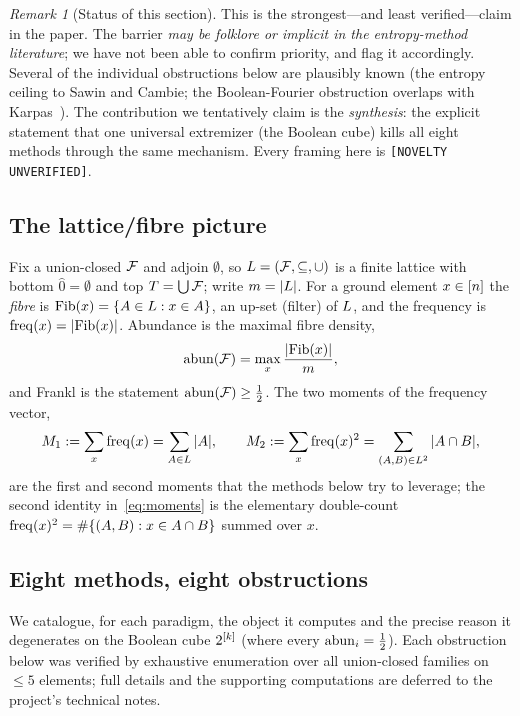 \documentclass[11pt]{amsart}
\theoremstyle{definition}
\theoremstyle{remark}
\newtheorem{remark}[theorem]{Remark}
\begin{document}
\begin{remark}[Status of this section]\label{rmk:barrier-status}
This is the strongest---and least verified---claim in the paper. The barrier
\emph{may be folklore or implicit in the entropy-method literature}; we have not
been able to confirm priority, and flag it accordingly. Several of the individual
obstructions below are plausibly known (the entropy ceiling to Sawin and Cambie;
the Boolean-Fourier obstruction overlaps with Karpas~\cite{karpas2017}). The
contribution we tentatively claim is the \emph{synthesis}: the explicit statement
that one universal extremizer (the Boolean cube) kills all eight methods through
the same mechanism. Every framing here is
\texttt{[NOVELTY UNVERIFIED]}.
\end{remark}

\subsection{The lattice/fibre picture}\label{ssec:fibre}
Fix a union-closed $\mathcal{F}$ and adjoin $\emptyset$, so $L=(\mathcal{F},\subseteq,\cup)$ is
a finite lattice with bottom $\hat 0=\emptyset$ and top $T=\bigcup\mathcal{F}$; write
$m=|L|$. For a ground element $x\in[n]$ the \emph{fibre} is
$\mathrm{Fib}(x)=\{A\in L:x\in A\}$, an up-set (filter) of $L$, and the frequency is
$\mathrm{freq}(x)=|\mathrm{Fib}(x)|$. Abundance is the maximal fibre density,
\begin{equation}\label{eq:abun-fibre}
   \operatorname{abun}(\mathcal{F})=\max_{x}\frac{|\mathrm{Fib}(x)|}{m},
\end{equation}
and Frankl is the statement $\operatorname{abun}(\mathcal{F})\ge\tfrac12$. The two moments of the
frequency vector,
\begin{equation}\label{eq:moments}
   M_1:=\sum_x\mathrm{freq}(x)=\sum_{A\in L}|A|,\qquad
   M_2:=\sum_x\mathrm{freq}(x)^2=\sum_{(A,B)\in L^2}|A\cap B|,
\end{equation}
are the first and second moments that the methods below try to leverage; the
second identity in~\eqref{eq:moments} is the elementary double-count
$\mathrm{freq}(x)^2=\#\{(A,B):x\in A\cap B\}$ summed over $x$.

\subsection{Eight methods, eight obstructions}\label{ssec:eight}
We catalogue, for each paradigm, the object it computes and the precise reason it
degenerates on the Boolean cube $2^{[k]}$ (where every $\operatorname{abun}_i=\tfrac12$). Each
obstruction below was verified by exhaustive enumeration over all union-closed
families on $\le 5$ elements; full details and the supporting computations are
deferred to the project's technical notes.
\end{document}
